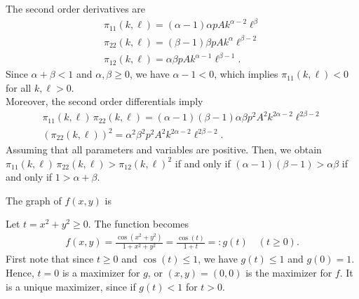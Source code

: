 \documentclass[letterpaper,10pt,english]{jupyterBook}
\begin{document}
\sphinxAtStartPar
The second order derivatives are
\begin{equation*}
\begin{split}
\pi_{11}(k,\ell) = (\alpha-1)\alpha pA k^{\alpha-2} \ell^\beta \\
\pi_{22}(k,\ell) = (\beta-1)\beta pA k^{\alpha} \ell^{\beta-2}\\
\pi_{12}(k, \ell) = \alpha \beta pA k^{\alpha-1} \ell^{\beta-1}.
\end{split}
\end{equation*}
\sphinxAtStartPar
Since \(\alpha+\beta<1\) and \(\alpha, \beta \geq 0\), we have \(\alpha-1<0\), which implies \(\pi_{11}(k,\ell)<0\) for all \(k, \ell >0\).\\
Moreover, the second order differentials imply
\begin{equation*}
\begin{split}
\pi_{11}(k, \ell) \, \pi_{22}(k, \ell) = (\alpha-1)(\beta-1)\alpha \beta p^2 A^2 k^{2\alpha-2} \ell^{2\beta-2}\\
(\pi_{22}(k, \ell))^2 = \alpha^2 \beta^2 p^2 A^2 k^{2\alpha-2} \ell^{2\beta-2}.
\end{split}
\end{equation*}
\sphinxAtStartPar
Assuming that all parameters and variables are positive.
Then, we obtain \(\pi_{11}(k, \ell) \, \pi_{22}(k, \ell) >  \pi_{12}(k, \ell)^2\) if and only if \((\alpha-1)(\beta-1) > \alpha \beta\) if and only if \(1 > \alpha + \beta\).

\sphinxAtStartPar
{}

\sphinxAtStartPar
The graph of \(f(x,y)\) is

\begin{figure}[htbp]
\centering

\noindent{}
\end{figure}

\sphinxAtStartPar
Let \(t = x^2+y^2 \geq 0\).
The function becomes
\begin{equation*}
\begin{split}
f(x,y) = \frac{\cos(x^2+y^2)}{1 + x^2+y^2} = \frac{\cos(t)}{1 + t} =: g(t)  \quad (t \geq 0).
\end{split}
\end{equation*}
\sphinxAtStartPar
First note that since \(t \geq 0\) and \(\cos(t) \leq 1\), we have \(g(t)\leq 1\) and \(g(0)=1\).
Hence, \(t=0\) is a maximizer for \(g\), or \((x,y)=(0,0)\) is the maximizer for \(f\).
It is a unique maximizer, since if \(g(t) < 1\) for \(t >0\).
\end{document}
